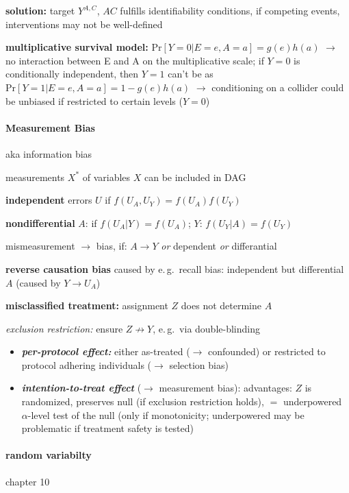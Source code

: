 \documentclass[8pt,oneside]{extarticle}
\begin{document}
\begin{multicols}{2}
\noindent \textbf{solution:} target $Y^{A, C}$, $AC$ fulfills identifiability conditions, \newline
 if competing events, interventions may not be well-defined


\noindent \textbf{multiplicative survival model:} $\mathrm{Pr}\left[Y{=}0|E{=}e, A{=}a\right]{=}g(e)h(a)$
$\rightarrow$ no interaction between E and A on the multiplicative scale; \newline
if $Y=0$ is conditionally independent, then $Y=1$ can't be as $\mathrm{Pr}\left[Y{=}1|E{=}e, A{=}a\right]{=}1-g(e)h(a)$
$\rightarrow$ conditioning on a collider could be unbiased if restricted to certain levels ($Y=0$)


\paragraph{\large Measurement Bias} aka information bias 

\noindent measurements $X^*$ of variables $X$ can be included in DAG

\noindent \textbf{independent} errors $U$ if $f(U_A, U_Y) = f(U_A)f(U_Y)$

\noindent \textbf{nondifferential} $A$:  if $f(U_A|Y)=f(U_A)$; $Y$: $f(U_Y|A)=f(U_Y)$

\noindent mismeasurement $\to$ bias, if: $A\to Y$ \textit{or} dependent \textit{or} differantial

\noindent \textbf{reverse causation bias} caused by e.\,g.\ recall bias: independent but differential $A$ (caused by $Y \to U_A$)


\noindent \textbf{misclassified treatment:} assignment $Z$ does not determine $A$

\noindent \textit{exclusion restriction:} ensure  $Z\not\to Y$, e.\,g.\ via double-blinding



\begin{itemize}[itemsep=0em, topsep=0pt, partopsep=0pt,parsep=0pt, leftmargin=1.5em]
\setlength{\itemsep}{0pt}%
\setlength{\parskip}{0pt}
\item \textit{\textbf{per-protocol effect:}} either as-treated ($\to$ confounded) or restricted to protocol adhering individuals ($\to$ selection bias)
\item \textit{\textbf{intention-to-treat effect}} ($\to$ measurement bias): advantages: $Z$ is randomized, preserves null (if exclusion restriction holds), $=$ underpowered $\alpha$-level test of the null (only if monotonicity; underpowered may be problematic if treatment safety is tested)
\end{itemize}





\paragraph{random variabilty} chapter 10




\end{multicols}
\end{document}
